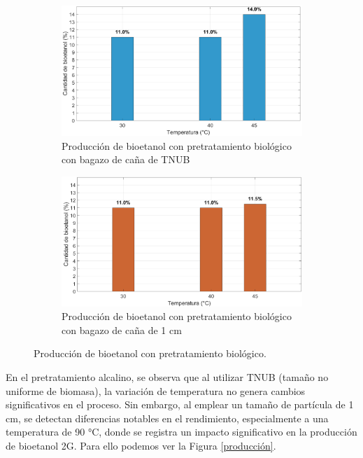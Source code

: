 \documentclass[12pt]{article}
\begin{document}
			\begin{figure}[H]
				\centering
				\begin{subfigure}[b]{0.49\textwidth}
					\includegraphics[width=\linewidth]{imagenes/biologico_TNUB}
					\caption{Producción de bioetanol con pretratamiento biológico con bagazo de caña  de TNUB}
					\label{fig:imagen1}
				\end{subfigure}
				\hfill %
				\begin{subfigure}[b]{0.49\textwidth}
					\includegraphics[width=\linewidth]{imagenes/biologico_11}
					\caption{Producción de bioetanol con pretratamiento biológico con bagazo de caña de 1 cm}
					\label{fig:imagen2}
				\end{subfigure}
				\caption{Producción de bioetanol con pretratamiento biológico.}
				\label{fig:pareja}
			\end{figure}

		
			
			
		
		En el pretratamiento alcalino, se observa que al utilizar TNUB (tamaño no uniforme de biomasa), la variación de temperatura no genera cambios significativos en el proceso. Sin embargo, al emplear un tamaño de partícula de 1 cm, se detectan diferencias notables en el rendimiento, especialmente a una temperatura de 90 °C, donde se registra un impacto significativo en la producción de bioetanol 2G. Para ello podemos ver la Figura \ref{producción}.
			
\end{document}
